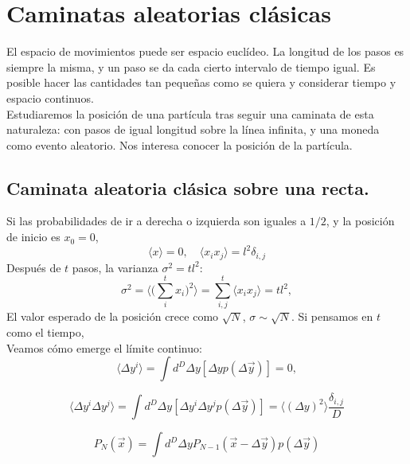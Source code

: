 
\section{Caminatas aleatorias clásicas}\label{CaminatasClasicas}
El espacio de movimientos puede ser espacio euclídeo. La longitud de los pasos es siempre la misma, y un paso se da cada cierto intervalo de tiempo igual. Es posible hacer las cantidades tan pequeñas como se quiera y considerar tiempo y espacio continuos.\\
Estudiaremos la posición de una partícula tras seguir una caminata de esta naturaleza: con pasos de igual longitud sobre la línea infinita, y una moneda como evento aleatorio. Nos interesa conocer la posición de la partícula.\\


\subsection{Caminata aleatoria clásica sobre una recta.}

Si las probabilidades de ir a derecha o izquierda son iguales a $1/2$, y la posición de inicio es $x_0=0$, 
\begin{equation}
\langle x\rangle=0,\quad \langle x_ix_j\rangle=l^2\delta_{i,j}
\end{equation}{}
Después de $t$ pasos, la varianza $\sigma^2=tl^2$:
\begin{equation}{}
\sigma^2=\Big \langle \big(\sum_i^t x_i \big)^2 \Big \rangle = \sum_{i,j}^t \langle x_i x_j \rangle = tl^2,
\end{equation}
El valor esperado de la posición crece como $\sqrt{N}$, $\sigma\sim \sqrt{N}$. Si pensamos en $t$ como el tiempo,\\
Veamos cómo emerge el límite continuo:
\begin{equation}
    \langle\Delta y^i\rangle=\int d^D \Delta y [\Delta y p(\Delta \Vec{y})]=0,
\end{equation}{}

\begin{equation}
    \langle\Delta y^i\Delta y^j\rangle=\int d^D \Delta y [\Delta y^i\Delta y^jp(\Delta \Vec{y})]=\langle(\Delta y)^2\rangle\frac{\delta_{i,j}}{D}
\end{equation}{}

\begin{equation}
P_N(\Vec{x})=\int d^D \Delta y P_{N-1}(\Vec{x}-\Delta \Vec{y})p(\Delta \Vec{y})    
\end{equation}{}


